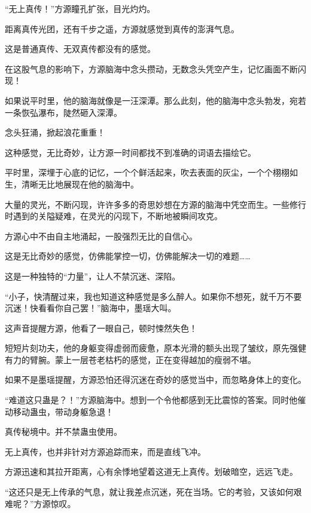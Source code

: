 
\begin{this_body}



“无上真传！”方源瞳孔扩张，目光灼灼。

距离真传光团，还有千步之遥，方源就感觉到真传的澎湃气息。

这是普通真传、无双真传都没有的感觉。

在这股气息的影响下，方源脑海中念头攒动，无数念头凭空产生，记忆画面不断闪现！

如果说平时里，他的脑海就像是一汪深潭。那么此刻，他的脑海中念头勃发，宛若一条恢弘瀑布，陡然砸入深潭。

念头狂涌，掀起浪花重重！

这种感觉，无比奇妙，让方源一时间都找不到准确的词语去描绘它。

平时里，深埋于心底的记忆，一个个鲜活起来，吹去表面的灰尘，一个个栩栩如生，清晰无比地展现在他的脑海中。

大量的灵光，不断闪现，许许多多的奇思妙想在方源的脑海中凭空而生。一些修行时遇到的关隘疑难，在灵光的闪现下，不断地被瞬间攻克。

方源心中不由自主地涌起，一股强烈无比的自信心。

这是无比奇妙的感觉，仿佛能掌控一切，仿佛能解决一切的难题……

这是一种独特的“力量”，让人不禁沉迷、深陷。

“小子，快清醒过来，我也知道这种感觉是多么醉人。如果你不想死，就千万不要沉迷！快看看你自己罢！”脑海中，墨瑶大叫。

这声音提醒方源，他看了一眼自己，顿时悚然失色！

短短片刻功夫，他的身躯变得虚弱而疲惫，原本光滑的额头出现了皱纹，原先强健有力的臂腕。蒙上一层苍老枯朽的感觉，正在变得越加的瘦弱不堪。

如果不是墨瑶提醒，方源恐怕还得沉迷在奇妙的感觉当中，而忽略身体上的变化。

“难道这只蛊是？！”方源脑海中。想到一个令他都感到无比震惊的答案。同时他催动移动蛊虫，带动身躯急退！

真传秘境中。并不禁蛊虫使用。

无上真传，也并非针对方源追踪而来，而是直线飞冲。

方源迅速和其拉开距离，心有余悸地望着这道无上真传。划破暗空，远远飞走。

“这还只是无上传承的气息，就让我差点沉迷，死在当场。它的考验，又该如何艰难呢？”方源惊叹。


\end{this_body}
